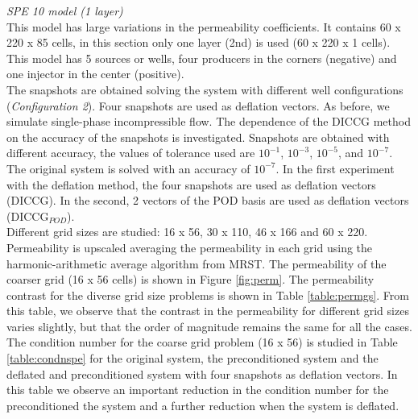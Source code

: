 \documentclass{ecmorXV}
\begin{document}
\newpage

\emph{SPE 10 model (1 layer)}\\
This model has large variations in the permeability coefficients.
It contains 60 x 220 x 85 cells, in this section only one layer (2nd) is used (60 x 220 x 1 cells).
This model has 5 sources or wells, four producers in the corners (negative) and one injector in the center (positive).
\\The snapshots are obtained solving the system with different well
configurations (\emph{Configuration 2}). Four snapshots are used as deflation vectors. As before,
we simulate single-phase incompressible flow.
The dependence of the DICCG method on the accuracy of the snapshots is investigated. Snapshots are obtained with different accuracy,
the values of tolerance used are
$10 ^{-1}$, $10 ^{-3}$, $10 ^{-5}$, and $10 ^{-7}$. The original system is solved with an accuracy of $10^{-7}$.
In the first experiment with the deflation method, the four snapshots are used as deflation vectors (DICCG). In the second, 
2 vectors of the POD basis are used as deflation vectors (DICCG$_{POD}$). 
\\ Different grid sizes are studied: 16 x 56, 30 x 110, 46 x 166 and 60 x 220.
\\Permeability is upscaled
averaging the permeability in each grid using the harmonic-arithmetic average algorithm from MRST.
The permeability of the coarser grid (16 x 56 cells) is shown in Figure \ref{fig:perm}.
The permeability contrast for the diverse grid size problems is shown in Table \ref{table:permgs}. 
From this table, we observe that the contrast in the permeability for different grid sizes varies slightly, but that the order
of magnitude remains the same for all the cases.\\
The condition number for the coarse grid problem (16 x 56) is studied in Table \ref{table:condnspe} for the 
original system, the preconditioned system and the deflated and preconditioned system with four snapshots as deflation vectors.
In this table we observe an important reduction in the condition number for the preconditioned the system
and a further reduction when the system is deflated.\\
\end{document}
